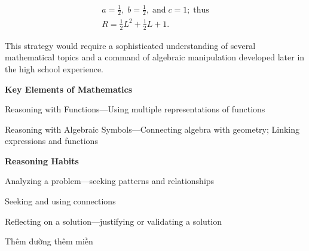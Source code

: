 \documentclass[
  10pt,
  a4paper,
  landscape,
  twoside,
  openany
]{scrbook}
\begin{document}
{\begin{description}
  $$
    \begin{aligned}
      a=\frac{1}{2}, \; b=\frac{1}{2}, \; \text{and} \; c=1; \; \text{thus}\\
      R=\frac{1}{2}L^2+\frac{1}{2}L+1.
    \end{aligned}
  $$

This strategy would require a sophisticated understanding of several mathematical topics and a command of algebraic manipulation developed later in the high school experience.
\end{description}

\noindent
\textbf{Key Elements of Mathematics}

Reasoning with Functions---Using multiple representations of functions

Reasoning with Algebraic Symbols---Connecting algebra with geometry; Linking expressions and functions

\noindent
\textbf{Reasoning Habits}

Analyzing a problem---seeking patterns and relationships

Seeking and using connections

Reflecting on a solution---justifying or validating a solution
}
{Thêm đường thêm miền}
\end{document}
